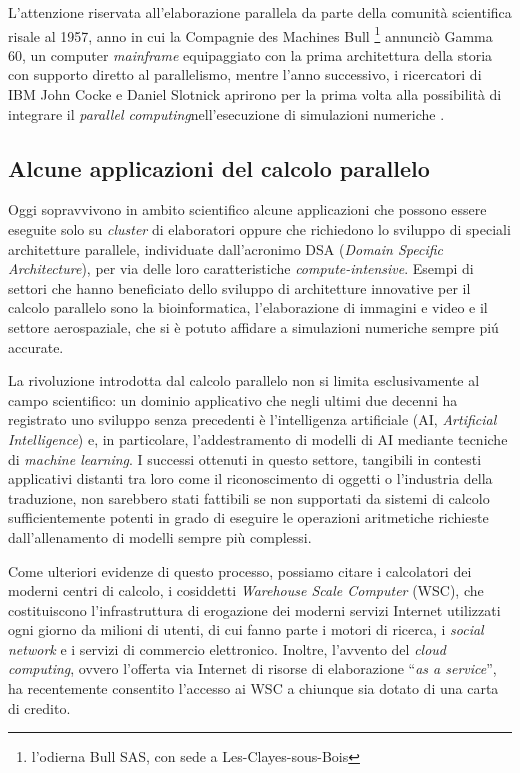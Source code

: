 L'attenzione riservata all'elaborazione parallela da parte della comunit\`a
scientifica risale al 1957, anno in cui la
Compagnie des Machines Bull \footnote{l'odierna Bull SAS, con sede a Les-Clayes-sous-Bois} annunci\`o Gamma 60, un computer \textit{mainframe}
equipaggiato con la prima architettura della storia con supporto diretto
al parallelismo, mentre l'anno successivo, i ricercatori di IBM John
Cocke e Daniel Slotnick aprirono per la prima volta alla
possibilit\`a di integrare il \textit{parallel computing}nell'esecuzione di simulazioni numeriche \cite{Wilson1994}.

\subsection{Alcune applicazioni del calcolo parallelo}
Oggi sopravvivono in ambito scientifico alcune applicazioni
che possono essere eseguite
solo su \textit{cluster} di elaboratori oppure che richiedono lo sviluppo di speciali architetture parallele, individuate dall'acronimo DSA (\textit{Domain Specific Architecture}), per via delle loro caratteristiche \textit{compute-intensive}.\newline
Esempi di settori che hanno beneficiato dello sviluppo di
architetture innovative per il calcolo parallelo sono la
bioinformatica, l'elaborazione di immagini e video
e il settore aerospaziale, che si \`e potuto affidare a simulazioni
numeriche sempre pi\'u accurate.

La rivoluzione introdotta dal calcolo parallelo non si limita esclusivamente al campo scientifico: un dominio applicativo che negli ultimi due decenni ha registrato uno sviluppo senza precedenti \`e l'intelligenza artificiale (AI, \textit{Artificial Intelligence}) e, in particolare, l'addestramento di modelli di AI mediante tecniche di \textit{machine learning}. \newline
I successi ottenuti in questo settore, tangibili in contesti applicativi distanti tra loro come il riconoscimento di oggetti o l'industria della traduzione, non sarebbero stati fattibili se non supportati da sistemi di calcolo sufficientemente potenti in grado di eseguire le operazioni aritmetiche richieste dall'allenamento di modelli sempre pi\`u complessi.

Come ulteriori evidenze di questo processo, possiamo citare i calcolatori dei moderni centri di calcolo, i cosiddetti \textit{Warehouse Scale Computer} (WSC), che costituiscono l'infrastruttura di erogazione dei moderni servizi Internet utilizzati ogni giorno da milioni di utenti, di cui fanno parte i motori di ricerca, i \textit{social network} e i servizi di commercio elettronico.\newline
Inoltre, l'avvento del \textit{cloud computing}, ovvero l'offerta via Internet di risorse di elaborazione \enquote{\textit{as a service}}, ha recentemente consentito l'accesso ai WSC a chiunque sia dotato di una carta di credito.
